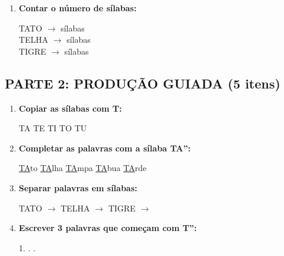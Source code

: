 \begin{exercicio}
\begin{enumerate}
  \item \textbf{Contar o número de sílabas:}
  \begin{center}
  TATO $\rightarrow$ \underline{\hspace{1cm}} sílabas \\
  TELHA $\rightarrow$ \underline{\hspace{1cm}} sílabas \\
  TIGRE $\rightarrow$ \underline{\hspace{1cm}} sílabas
  \end{center}
\end{enumerate}

\subsection*{PARTE 2: PRODUÇÃO GUIADA (5 itens)}

\begin{enumerate}[resume]
  \item \textbf{Copiar as sílabas com T:}
  \begin{center}
  TA \quad \underline{\hspace{1.5cm}} \quad TE \quad \underline{\hspace{1.5cm}} \quad TI \quad \underline{\hspace{1.5cm}} \quad TO \quad \underline{\hspace{1.5cm}} \quad TU \quad \underline{\hspace{1.5cm}}
  \end{center}

  \item \textbf{Completar as palavras com a sílaba TA'':}
  \begin{center}
  \underline{TA}to \quad \underline{TA}lha \quad \underline{TA}mpa \quad \underline{TA}bua \quad \underline{TA}rde
  \end{center}

  \item \textbf{Separar palavras em sílabas:}
  \begin{center}
  TATO $\rightarrow$ \underline{\hspace{1.5cm}} \quad TELHA $\rightarrow$ \underline{\hspace{1.5cm}} \quad TIGRE $\rightarrow$ \underline{\hspace{1.5cm}}
  \end{center}

  \item \textbf{Escrever 3 palavras que começam com T'':}
  \begin{center}
  1. \underline{\hspace{3cm}} . \underline{\hspace{3cm}} . \underline{\hspace{3cm}}
  \end{center}


\end{enumerate}
\end{exercicio}
